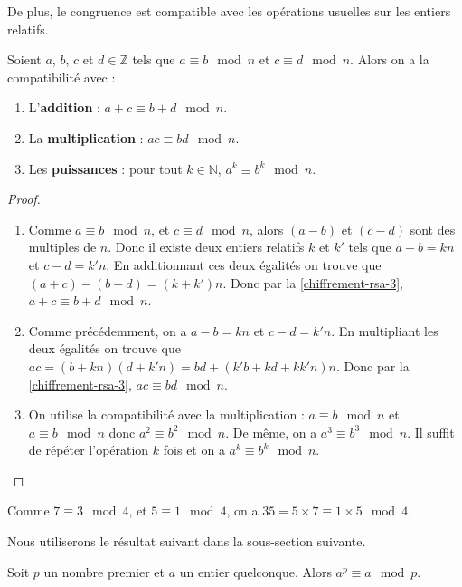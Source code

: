   De plus, le congruence est compatible avec les opérations usuelles sur les entiers relatifs.

  \begin{theorem}
    Soient $a$, $b$, $c$ et $d \in \mathbb{Z}$ tels que $a \equiv b \mod n$ et $c \equiv d \mod n$. Alors on a la compatibilité avec :
    \begin{enumerate}[label=(\roman*)]
      \item L'\textbf{addition} : $a + c \equiv b + d \mod n$.
      \item La \textbf{multiplication} : $ac \equiv bd \mod n$.
      \item Les \textbf{puissances} : pour tout $k \in \mathbb{N}$, $a^k \equiv b^k \mod n$.
    \end{enumerate}
  \end{theorem}

  \begin{proof}
    \begin{enumerate}[label=(\roman*)]
      \item Comme $a \equiv b \mod n$, et $c \equiv d \mod n$, alors $(a-b)$ et $(c-d)$ sont des multiples de $n$. Donc il existe deux entiers relatifs $k$ et $k'$ tels que $a-b = kn$ et $c-d = k'n$. En additionnant ces deux égalités on trouve que $(a+c) - (b+d) = (k+k')n$. Donc par la \cref{chiffrement-rsa-3}, $a + c \equiv b + d \mod n$.
      \item Comme précédemment, on a $a-b = kn$ et $c-d = k'n$. En multipliant les deux égalités on trouve que $ac = (b+kn)(d+k'n) = bd + (k'b + kd + kk'n)n$. Donc par la \cref{chiffrement-rsa-3}, $ac \equiv bd \mod n$.
      \item On utilise la compatibilité avec la multiplication : $a \equiv b \mod n$ et $a \equiv b \mod n$ donc $a^2 \equiv b^2 \mod n$. De même, on a $a^3 \equiv b^3 \mod n$. Il suffit de répéter l'opération $k$ fois et on a $a^k \equiv b^k \mod n$.
    \end{enumerate}
  \end{proof}

  \begin{example}
    Comme $7 \equiv 3 \mod 4$, et $5 \equiv 1 \mod 4$, on a $35 = 5 \times 7 \equiv 1 \times 5 \mod 4$.
  \end{example}

  Nous utiliserons le résultat suivant dans la sous-section suivante.

  \begin{theorem}
    \label{chiffrement-rsa-5}
    Soit $p$ un nombre premier et $a$ un entier quelconque. Alors $a^p \equiv a \mod p$.
  \end{theorem}

